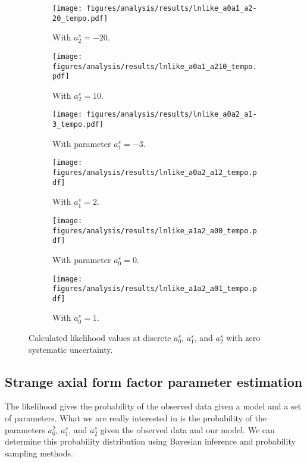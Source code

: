     \begin{figure}[h]
      \centering
      \begin{subfigure}[t]{2.8in}
        \texttt{[image: figures/analysis/results/lnlike\_a0a1\_a2-20\_tempo.pdf]}
        \caption{With $a_2^s = -20$.}
        \label{fig:lka0a1m20}
      \end{subfigure}
      \hspace{2pt}
      \begin{subfigure}[t]{2.8in}
        \texttt{[image: figures/analysis/results/lnlike\_a0a1\_a210\_tempo.pdf]}
        \caption{With $a_2^s = 10$.}
        \label{fig:lka0a1p10}
      \end{subfigure}
      \begin{subfigure}[t]{2.8in}
        \texttt{[image: figures/analysis/results/lnlike\_a0a2\_a1-3\_tempo.pdf]}
        \caption{With parameter $a_1^s = -3$.}
        \label{fig:lka0a2m3}
      \end{subfigure}
      \hspace{2pt}
      \begin{subfigure}[t]{2.8in}
        \texttt{[image: figures/analysis/results/lnlike\_a0a2\_a12\_tempo.pdf]}
        \caption{With $a_1^s = 2$.}
        \label{fig:lka0a2p2}
      \end{subfigure}
      \begin{subfigure}[t]{2.8in}
        \texttt{[image: figures/analysis/results/lnlike\_a1a2\_a00\_tempo.pdf]}
        \caption{With parameter $a_0^s = 0$.}
        \label{fig:lka1a2m0}
      \end{subfigure}
      \hspace{2pt}
      \begin{subfigure}[t]{2.8in}
        \texttt{[image: figures/analysis/results/lnlike\_a1a2\_a01\_tempo.pdf]}
        \caption{With $a_0^s = 1$.}
        \label{fig:lka1a2p1}
      \end{subfigure}
      \caption{Calculated likelihood values at discrete $a_0^s$, $a_1^s$, and
      $a_2^s$ with zero systematic uncertainty.}
      \label{fig:likelihoods}
    \end{figure}

    \FloatBarrier
    

\subsection{Strange axial form factor parameter estimation}\label{sec:deltas}
  The likelihood gives the probability of the observed data given a model and a
  set of parameters. What we are really interested in is the probability of the
  parameters $a_0^2$, $a_1^s$, and $a_2^s$ given the observed data and our
  model. We can determine this probability distribution using Bayesian
  inference and probability sampling methods.

